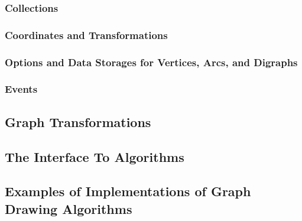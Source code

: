 
\subsubsection{Collections}


\subsubsection{Coordinates and Transformations}


\subsubsection{Options and Data Storages for Vertices, Arcs, and Digraphs}


\subsubsection{Events}

\label{section-gd-events}




\subsection{Graph Transformations}

\label{section-gd-transformations}




\subsection{The Interface To Algorithms}

\label{section-gd-interface-to-algorithms}







\subsection{Examples of Implementations of Graph Drawing Algorithms}
\label{section-gd-examples}

